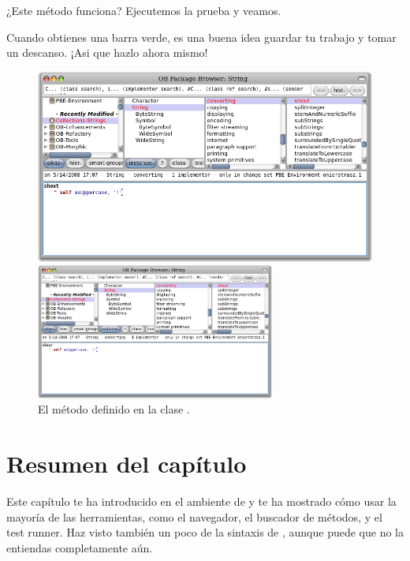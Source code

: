 \documentclass[a4paper,10pt,twoside]{book}
\begin{document}
¿Este m\'etodo funciona? Ejecutemos la prueba y veamos.

Cuando obtienes una barra verde\footnotemark, es una buena idea guardar tu trabajo y tomar un descanso.
¡Asi que hazlo ahora mismo!

\begin{figure}[hbt]
\ifluluelse
	{\centerline{\includegraphics[width=\textwidth]{String-Shout}}}
	{\centerline{\includegraphics[width=0.7\textwidth]{String-Shout}}}
\caption{El m\'etodo  definido en la clase .
}
\end{figure}

\section{Resumen del cap\'itulo}
Este cap\'itulo te ha introducido en el ambiente de \pharo y te ha mostrado c\'omo usar la mayor\'ia de las herramientas, como el navegador, el buscador de m\'etodos, y el test runner. Haz visto tambi\'en un poco de la sintaxis de \pharo, aunque puede que no la entiendas completamente a\'un.
\end{document}
